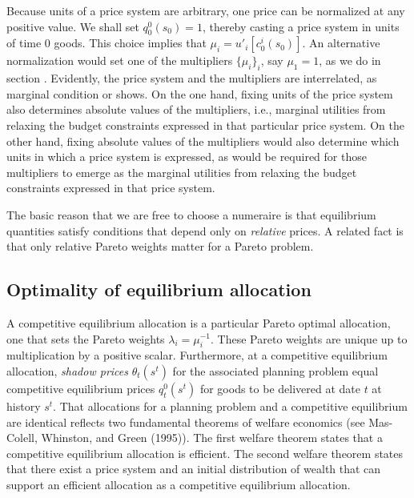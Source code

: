  Because  units of a
price system are arbitrary, one price
can be  normalized
at any positive value.  We shall set $q^0_0(s_0)= 1$,
thereby casting a  price system in units of time $0$
  goods. This choice implies that
 $\mu_i  =  u'_i[c_0^i(s_0)] $.
An alternative  normalization would set  one of the
multipliers $\{\mu_i\}_i$, say $\mu_1=1$, as
we do 
in section . Evidently, the price 
system and the multipliers are interrelated,
as  marginal condition  
or  shows. On the one hand, fixing 
units of the price system also determines  
absolute values of the multipliers, i.e., 
marginal utilities from relaxing the budget
constraints expressed in that particular price 
system. On the other hand, fixing 
absolute values of the multipliers would 
also determine  which units in which a  price system is 
expressed, as would be required for those multipliers to 
emerge as the marginal utilities from relaxing 
the budget constraints expressed in that
price system. 


The basic reason that we are free to choose a numeraire is that equilibrium quantities satisfy conditions that depend only  on {\it relative}
prices.  A related fact is that   only relative Pareto
weights matter for a Pareto problem.




\subsection{Optimality of equilibrium 
                          allocation}\label{sec:PO}%
  A competitive  equilibrium allocation   is a particular Pareto
optimal allocation, one that sets the Pareto weights $\lambda_i =
\mu_i^{-1}$.  These Pareto weights are unique up to multiplication by a positive scalar. Furthermore, at a
competitive equilibrium allocation,  {\it shadow prices\/}
$\theta_t(s^t)$ for the associated planning problem equal  competitive equilibrium
prices $q_t^0(s^t)$ for goods to be delivered at date $t$
at  history $s^t$. %
 That  allocations for a planning
problem and a competitive equilibrium are identical reflects 
two fundamental theorems of welfare economics (see Mas-Colell,
Whinston, and Green (1995)).
The first welfare theorem states that a  competitive equilibrium allocation is efficient.
The second welfare theorem states that there exist a price system and  an initial distribution of wealth that can support an
  efficient allocation as a competitive equilibrium allocation.


